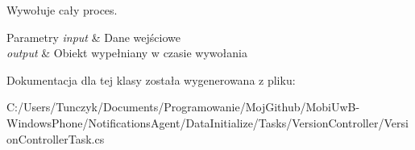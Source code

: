 Wywołuje cały proces. 


\begin{DoxyParams}{Parametry}
{\em input} & Dane wejściowe\\
\hline
{\em output} & Obiekt wypełniany w czasie wywołania\\
\hline
\end{DoxyParams}


Dokumentacja dla tej klasy została wygenerowana z pliku\+:\begin{DoxyCompactItemize}
\item 
C\+:/\+Users/\+Tunczyk/\+Documents/\+Programowanie/\+Moj\+Github/\+Mobi\+Uw\+B-\/\+Windows\+Phone/\+Notifications\+Agent/\+Data\+Initialize/\+Tasks/\+Version\+Controller/Version\+Controller\+Task.\+cs\end{DoxyCompactItemize}
